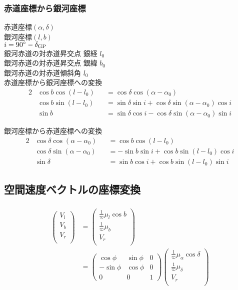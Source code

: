 \subsubsection{赤道座標から銀河座標}
赤道座標$(\alpha, \delta)$ \\
銀河座標$(l, b)$ \\
$i = 90^{\circ} - \delta_{\rm GP}$\\
銀河赤道の対赤道昇交点 銀経 $l_0$\\
銀河赤道の対赤道昇交点 銀緯 $b_0$\\
銀河赤道の対赤道傾斜角 $l_0$\\

赤道座標から銀河座標への変換
\begin{alignat}{2}
    &\cos b \cos(l-l_0)& &= \cos\delta \cos(\alpha-\alpha_0) \\
    &\cos b \sin(l-l_0)& &= \sin\delta \sin i + \cos\delta \sin(\alpha-\alpha_0) \cos i \\
    &\sin b& &= \sin\delta \cos i - \cos\delta \sin(\alpha-\alpha_0) \sin i
\end{alignat}

銀河座標から赤道座標への変換
\begin{alignat}{2}
    &\cos \delta \cos(\alpha-\alpha_0)& &= \cos b \cos(l-l_0) \\
    &\cos \delta \sin(\alpha-\alpha_0)& &= -\sin b \sin i + \cos b \sin(l-l_0) \cos i \\
    &\sin \delta& &= \sin b \cos i + \cos b \sin(l-l_0) \sin i
\end{alignat}

\subsection{空間速度ベクトルの座標変換}
\begin{align}
\begin{aligned}
    \left(
	\begin{array}{c}
	 	V_l\\
		V_b\\
		V_r\\
	\end{array}
	\right)
	&=
	\left(
	\begin{array}{c}
	 	\frac{1}{\varpi}\mu_{l}\cos b\\
		\frac{1}{\varpi}\mu_{b}\\
		V_{r}\\
	\end{array}
	\right) \\
	&=
	\left(
	\begin{array}{ccc}
	 	\cos \phi & \sin \phi & 0\\
		-\sin \phi & \cos \phi & 0\\
		0 & 0 & 1
	\end{array}
	\right)
	\left(
	\begin{array}{c}
	 	\frac{1}{\varpi}\mu_{\alpha}\cos \delta\\
		\frac{1}{\varpi}\mu_{\delta}\\
		V_{r}\\
	\end{array}
	\right)
\end{aligned}
\end{align}


